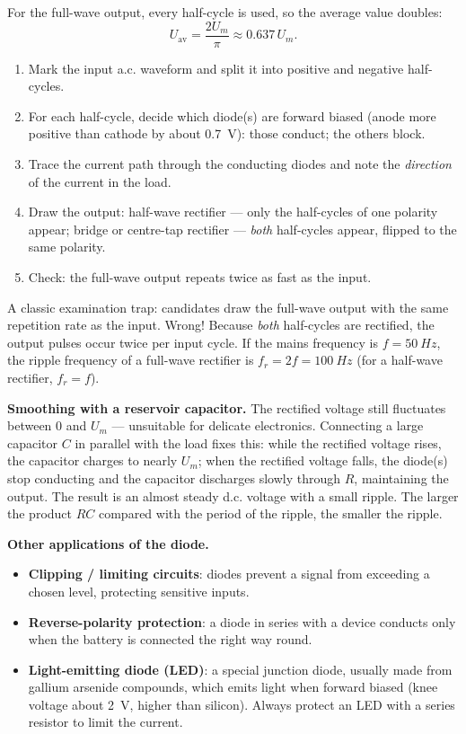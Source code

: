 \documentclass[11pt]{article}
\newcommand{\cle}[1]{{\popxbold\color{popdark}#1}}
\begin{document}
For the full-wave output, every half-cycle is used, so the average value doubles:
\[
U_{\text{av}} = \frac{2U_m}{\pi} \approx 0.637\,U_m .
\]

\begin{methode}
\begin{enumerate}
\item Mark the input a.c. waveform and split it into positive and negative half-cycles.
\item For each half-cycle, decide which diode(s) are forward biased (anode more positive than cathode by about \SI{0.7}{V}): those conduct; the others block.
\item Trace the current path through the conducting diodes and note the \emph{direction} of the current in the load.
\item Draw the output: half-wave rectifier --- only the half-cycles of one polarity appear; bridge or centre-tap rectifier --- \emph{both} half-cycles appear, flipped to the same polarity.
\item Check: the full-wave output repeats twice as fast as the input.
\end{enumerate}
\end{methode}

\begin{attention}
A classic examination trap: candidates draw the full-wave output with the same repetition rate as the input. Wrong! Because \emph{both} half-cycles are rectified, the output pulses occur twice per input cycle. If the mains frequency is $f = \SI{50}{Hz}$, the ripple frequency of a full-wave rectifier is $f_r = 2f = \SI{100}{Hz}$ (for a half-wave rectifier, $f_r = f$).
\end{attention}

\textbf{Smoothing with a reservoir capacitor.} The rectified voltage still fluctuates between $0$ and $U_m$ --- unsuitable for delicate electronics. Connecting a large capacitor $C$ in parallel with the load fixes this: while the rectified voltage rises, the capacitor charges to nearly $U_m$; when the rectified voltage falls, the diode(s) stop conducting and the capacitor discharges slowly through $R$, maintaining the output. The result is an almost steady d.c. voltage with a small \cle{ripple}. The larger the product $RC$ compared with the period of the ripple, the smaller the ripple.

\textbf{Other applications of the diode.}
\begin{itemize}
\item \textbf{Clipping / limiting circuits}: diodes prevent a signal from exceeding a chosen level, protecting sensitive inputs.
\item \textbf{Reverse-polarity protection}: a diode in series with a device conducts only when the battery is connected the right way round.
\item \textbf{Light-emitting diode (LED)}: a special junction diode, usually made from gallium arsenide compounds, which emits light when forward biased (knee voltage about \SI{2}{V}, higher than silicon). Always protect an LED with a series resistor to limit the current.
\end{itemize}
\end{document}
